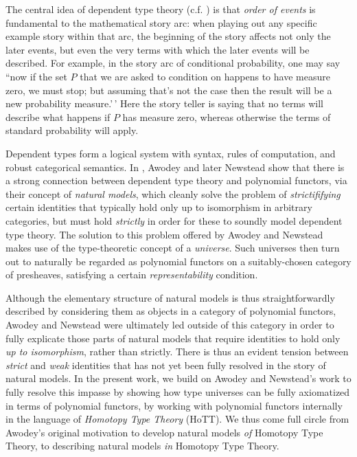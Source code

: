 \documentclass[
  11pt,
  oneside,
  article]{memoir}
\theoremstyle{definition}
\theoremstyle{plain}
\newcommand{\0}{\textsf{0}}
\newcommand{\1}{\tn{\textsf{1}}}
\begin{document}
The central idea of dependent type theory (c.f.
\cite{martin-lof1975intuitionistic}) is that \emph{order of events} is
fundamental to the mathematical story arc: when playing out any specific
example story within that arc, the beginning of the story affects not
only the later events, but even the very terms with which the later
events will be described. For example, in the story arc of conditional
probability, one may say ``now if the set \(P\) that we are asked to
condition on happens to have measure zero, we must stop; but assuming
that's not the case then the result will be a new probability
measure.'\,' Here the story teller is saying that no terms will describe
what happens if \(P\) has measure zero, whereas otherwise the terms of
standard probability will apply.

Dependent types form a logical system with syntax, rules of computation,
and robust categorical semantics. In
\cite{awodey2014natural,awodey2018polynomial}, Awodey and later Newstead
show that there is a strong connection between dependent type theory and
polynomial functors, via their concept of \emph{natural models}, which
cleanly solve the problem of \emph{strictififying} certain identities
that typically hold only up to isomorphism in arbitrary categories, but
must hold \emph{strictly} in order for these to soundly model dependent
type theory. The solution to this problem offered by Awodey and Newstead
makes use of the type-theoretic concept of a \emph{universe}. Such
universes then turn out to naturally be regarded as polynomial functors
on a suitably-chosen category of presheaves, satisfying a certain
\emph{representability} condition.

Although the elementary structure of natural models is thus
straightforwardly described by considering them as objects in a category
of polynomial functors, Awodey and Newstead were ultimately led outside
of this category in order to fully explicate those parts of natural
models that require identities to hold only \emph{up to isomorphism},
rather than strictly. There is thus an evident tension between
\emph{strict} and \emph{weak} identities that has not yet been fully
resolved in the story of natural models. In the present work, we build
on Awodey and Newstead's work to fully resolve this impasse by showing
how type universes can be fully axiomatized in terms of polynomial
functors, by working with polynomial functors internally in the language
of \emph{Homotopy Type Theory} (HoTT). We thus come full circle from
Awodey's original motivation to develop natural models \emph{of}
Homotopy Type Theory, to describing natural models \emph{in} Homotopy
Type Theory.
\end{document}
